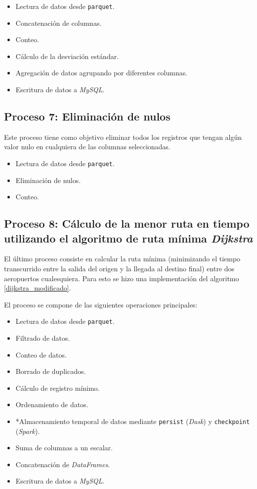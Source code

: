 \begin{itemize}
	\item Lectura de datos desde \texttt{parquet}.
	\item Concatenación de columnas.
	\item Conteo.
	\item Cálculo de la desviación estándar.
	\item Agregación de datos agrupando por diferentes columnas.
	\item Escritura de datos a \textit{MySQL}.
\end{itemize}

\subsection{Proceso 7: Eliminación de nulos}

Este proceso tiene como objetivo eliminar todos los registros que tengan algún valor nulo en cualquiera de las columnas seleccionadas. 

\begin{itemize}
	\item Lectura de datos desde \texttt{parquet}.
	\item Eliminación de nulos.
	\item Conteo.
\end{itemize}

\subsection{Proceso 8: Cálculo de la menor ruta en tiempo utilizando el algoritmo de ruta mínima \textit{Dijkstra}}

El último proceso consiste en calcular la ruta mínima (minimizando el tiempo transcurrido entre la salida del origen y la llegada al destino final) entre dos aeropuertos cualesquiera. Para esto se hizo una implementación del algoritmo \ref{dijkstra_modificado}.   

El proceso se compone de las siguientes operaciones principales:

\begin{itemize}
	\item Lectura de datos desde \texttt{parquet}.
	\item Filtrado de datos.
	\item Conteo de datos.
	\item Borrado de duplicados.
	\item Cálculo de registro mínimo.
	\item Ordenamiento de datos.
	\item *Almacenamiento temporal de datos mediante \texttt{persist} (\textit{Dask}) y \texttt{checkpoint} (\textit{Spark}).
	\item Suma de columnas a un escalar.
	\item Concatenación de \textit{DataFrames}.
	\item Escritura de datos a \textit{MySQL}.
\end{itemize}


